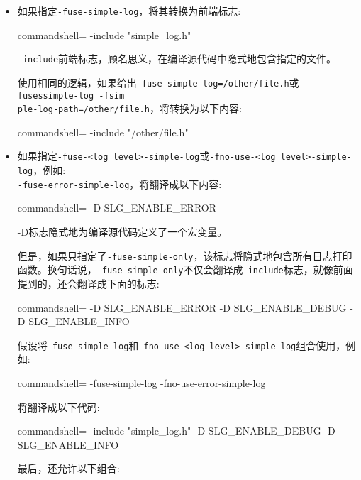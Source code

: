 \begin{itemize}
\item 如果指定\texttt{-fuse-simple-log}，将其转换为前端标志:

\begin{tcblisting}{commandshell={}}
-include "simple_log.h"
\end{tcblisting}

\texttt{-include}前端标志，顾名思义，在编译源代码中隐式地包含指定的文件。

使用相同的逻辑，如果给出\texttt{-fuse-simple-log=/other/file.h}或\texttt{-fusessimple-log -fsim\\ple-log-path=/other/file.h}，将转换为以下内容:

\begin{tcblisting}{commandshell={}}
-include "/other/file.h"
\end{tcblisting}

\item 如果指定\texttt{-fuse-<log level>-simple-log}或\texttt{-fno-use-<log level>-simple-log}，例如:\\\texttt{-fuse-error-simple-log}，将翻译成以下内容:

\begin{tcblisting}{commandshell={}}
-D SLG_ENABLE_ERROR
\end{tcblisting}

-D标志隐式地为编译源代码定义了一个宏变量。

但是，如果只指定了\texttt{-fuse-simple-only}，该标志将隐式地包含所有日志打印函数。换句话说，\texttt{-fuse-simple-only}不仅会翻译成\texttt{-include}标志，就像前面提到的，还会翻译成下面的标志:

\begin{tcblisting}{commandshell={}}
-D SLG_ENABLE_ERROR -D SLG_ENABLE_DEBUG -D SLG_ENABLE_INFO
\end{tcblisting}

假设将\texttt{-fuse-simple-log}和\texttt{-fno-use-<log level>-simple-log}组合使用，例如:

\begin{tcblisting}{commandshell={}}
-fuse-simple-log -fno-use-error-simple-log
\end{tcblisting}

将翻译成以下代码:

\begin{tcblisting}{commandshell={}}
-include "simple_log.h" -D SLG_ENABLE_DEBUG -D SLG_ENABLE_INFO
\end{tcblisting}

最后，还允许以下组合:


\end{itemize}
